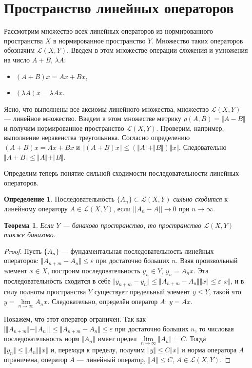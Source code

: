 \documentclass[12pt,a4paper,titlepage,oneside]{book}
\theoremstyle{definition}
\newtheorem*{definition}{Определение}
\theoremstyle{plain}
\newtheorem*{theorem}{Теорема}
\theoremstyle{break}
\theoremstyle{remark}
\theoremstyle{remark}
\theoremstyle{remark}
\theoremstyle{remark}
\theoremstyle{plain}
\theoremstyle{plain}
\begin{document}
\section{Пространство линейных операторов}
Рассмотрим множество всех линейных операторов из нормированного пространства $X$ в нормированное пространство $Y$. Множество таких операторов обозначим $\mathcal{L}(X,Y)$. Введем в этом множестве операции сложения и умножения на число $A + B$, $\lambda A$:
\begin{itemize}
	\item $(A+B)x = Ax+Bx$,
	\item $(\lambda A)x = \lambda Ax$.
\end{itemize}

Ясно, что выполнены все аксиомы линейного множества, множество $\mathcal{L}(X,Y)$ --- линейное множество. Введем в этом множестве метрику $\rho(A, B) = \Vert A-B \Vert$ и получим нормированное пространство $\mathcal{L}(X,Y)$. Проверим, например, выполнение неравенства треугольника. Согласно определению $(A+B)x = Ax+Bx$ и $\Vert(A+B)x\Vert\le(\Vert A\Vert+\Vert B\Vert)\Vert x\Vert$. Следовательно $\Vert A+B\Vert\le\Vert A\Vert+\Vert B\Vert$.

Определим теперь понятие сильной сходимости последовательности линейных операторов.

\begin{definition}
Последовательность $\{A_n\} \subset \mathcal{L}(X,Y)$ \textit{сильно сходится} к линейному оператору $A\in \mathcal{L}(X,Y)$, если $||A_n-A||\to 0$ при $n\to {\infty}$.
\end{definition}

\begin{theorem}
Если $Y$ --- банахово пространство, то пространство $\mathcal{L}(X,Y)$ также банахово.
\end{theorem}

\begin{proof}
Пусть $\{A_n\}$ --- фундаментальная последовательность линейных операторов: $\Vert A_{n+m} - A_n \Vert\le \varepsilon$ при достаточно больших $n$. Взяв произвольный элемент $x\in X$, построим последовательность $y_n\in Y$, $y_n=A_nx$. Эта последовательность сходится в себе $\Vert y_{n+m}-y_n\Vert\le \Vert A_{n+m}-A_n\Vert \Vert x\Vert\le \varepsilon \Vert x\Vert$, и в силу полноты пространства $Y$ существует предельный элемент $y \leqslant Y$, такой что $y=\lim \limits_{n \to \infty} A_n x$. Следовательно, определён оператор $A$: $y = Ax$.

Покажем, что этот оператор ограничен. Так как $ \big\lvert \Vert A_{n+m} \Vert - \Vert A_n\Vert \big\rvert \leqslant \Vert A_{n+m} - A_n \Vert \leqslant \varepsilon$ при достаточно больших $n$, то числовая последовательность норм $\Vert A_n\Vert$ имеет предел $\lim \limits_{n\to \infty} \Vert A_n\Vert=C$. Тогда $\Vert y_n \Vert \leqslant \Vert A_n\Vert \Vert x\Vert$ и, переходя к пределу, получим $\Vert y \Vert \leqslant C \Vert x \Vert$ и норма оператора $A$ ограничена, оператор $A$ --- линейный оператор, $\Vert A\Vert \leqslant C$, $A \in \mathcal{L}(X,Y)$.
\end{proof}
\end{document}
